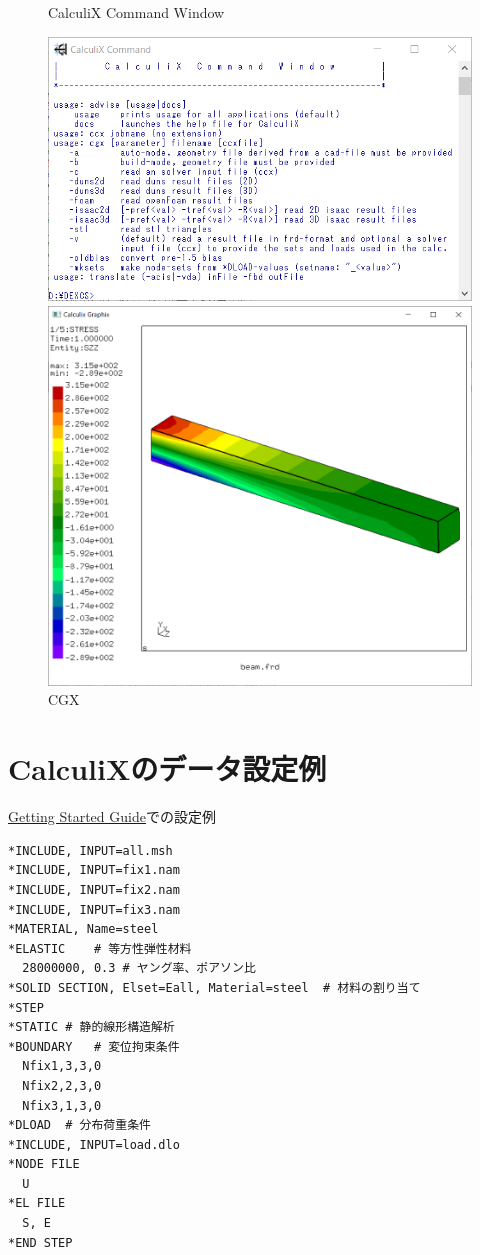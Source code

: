 \documentclass[a4j,20pt,slide]{ltjsarticle}
\begin{document}
\begin{figure}[H]
	\begin{minipage}{0.49\hsize}
		\caption{CalculiX Command Window}
		\centering
		\includegraphics[width=.9\columnwidth]{fig/CCX.png}
	\end{minipage}
	\begin{minipage}{0.49\hsize}
		\caption{CGX}
		\centering
		\includegraphics[width=.65\columnwidth]{fig/CGX.png}
	\end{minipage}
\end{figure}
%
\section{CalculiXのデータ設定例}
\href{http://www.bconverged.com/content/calculix/doc/GettingStarted.pdf}{Getting Started Guide}での設定例
\begin{lstlisting}[caption=beam.inp]
*INCLUDE, INPUT=all.msh
*INCLUDE, INPUT=fix1.nam
*INCLUDE, INPUT=fix2.nam
*INCLUDE, INPUT=fix3.nam
*MATERIAL, Name=steel
*ELASTIC	# 等方性弾性材料
  28000000, 0.3	# ヤング率、ポアソン比
*SOLID SECTION, Elset=Eall, Material=steel	# 材料の割り当て
*STEP
*STATIC	# 静的線形構造解析
*BOUNDARY	# 変位拘束条件
  Nfix1,3,3,0
  Nfix2,2,3,0
  Nfix3,1,3,0
*DLOAD	# 分布荷重条件
*INCLUDE, INPUT=load.dlo
*NODE FILE
  U
*EL FILE
  S, E
*END STEP
\end{lstlisting}
%
\end{document}

